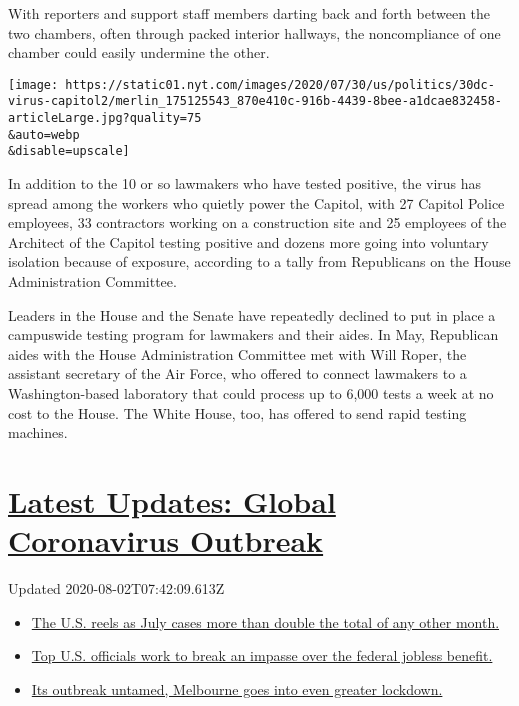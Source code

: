With reporters and support staff members darting back and forth between
the two chambers, often through packed interior hallways, the
noncompliance of one chamber could easily undermine the other.

\texttt{[image: https://static01.nyt.com/images/2020/07/30/us/politics/30dc-virus-capitol2/merlin\_175125543\_870e410c-916b-4439-8bee-a1dcae832458-articleLarge.jpg?quality=75\\\&auto=webp\\\&disable=upscale]}

In addition to the 10 or so lawmakers who have tested positive, the
virus has spread among the workers who quietly power the Capitol, with
27 Capitol Police employees, 33 contractors working on a construction
site and 25 employees of the Architect of the Capitol testing positive
and dozens more going into voluntary isolation because of exposure,
according to a tally from Republicans on the House Administration
Committee.

Leaders in the House and the Senate have repeatedly declined to put in
place a campuswide testing program for lawmakers and their aides. In
May, Republican aides with the House Administration Committee met with
Will Roper, the assistant secretary of the Air Force, who offered to
connect lawmakers to a Washington-based laboratory that could process up
to 6,000 tests a week at no cost to the House. The White House, too, has
offered to send rapid testing machines.

\hypertarget{latest-updates-global-coronavirus-outbreak}{%
\section{\texorpdfstring{\href{https://www.nytimes.com/2020/08/01/world/coronavirus-covid-19.html?action=click\&pgtype=Article\&state=default\&region=MAIN_CONTENT_1\&context=storylines_live_updates}{Latest
Updates: Global Coronavirus
Outbreak}}{Latest Updates: Global Coronavirus Outbreak}}\label{latest-updates-global-coronavirus-outbreak}}

Updated 2020-08-02T07:42:09.613Z

\begin{itemize}
\tightlist
\item
  \href{https://www.nytimes.com/2020/08/01/world/coronavirus-covid-19.html?action=click\&pgtype=Article\&state=default\&region=MAIN_CONTENT_1\&context=storylines_live_updates\#link-34047410}{The
  U.S. reels as July cases more than double the total of any other
  month.}
\item
  \href{https://www.nytimes.com/2020/08/01/world/coronavirus-covid-19.html?action=click\&pgtype=Article\&state=default\&region=MAIN_CONTENT_1\&context=storylines_live_updates\#link-780ec966}{Top
  U.S. officials work to break an impasse over the federal jobless
  benefit.}
\item
  \href{https://www.nytimes.com/2020/08/01/world/coronavirus-covid-19.html?action=click\&pgtype=Article\&state=default\&region=MAIN_CONTENT_1\&context=storylines_live_updates\#link-2bc8948}{Its
  outbreak untamed, Melbourne goes into even greater lockdown.}
\end{itemize}

